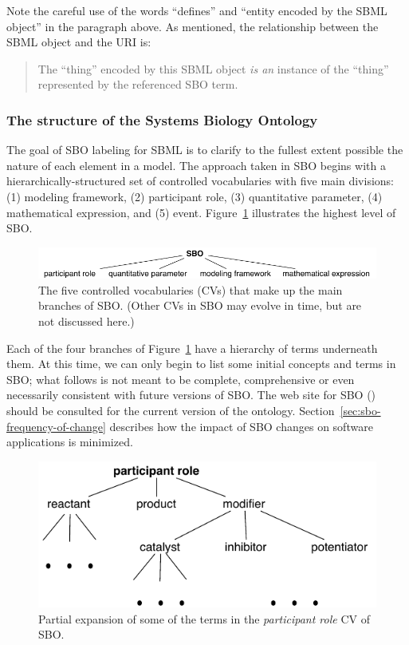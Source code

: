 Note the careful use of the words ``defines'' and ``entity encoded
by the SBML object'' in the paragraph above.  As mentioned, the
relationship between the SBML object and the URI is:
\begin{quote}
  The ``thing'' encoded by this SBML object \emph{is an} instance
  of the ``thing'' represented by the referenced SBO term.
\end{quote}


\subsubsection{The structure of the Systems Biology Ontology}

The goal of SBO labeling for SBML is to clarify to the fullest
extent possible the nature of each element in a
model.  The approach taken in SBO begins with a
hierarchically-structured set of controlled vocabularies with five
main divisions: (1) modeling framework, (2) participant role, (3)
quantitative parameter, (4) mathematical expression, and (5) event.
Figure~\ref{fig:sbo-top-level} illustrates the highest level of
SBO.

\begin{figure}[tbh]
  \vspace*{1ex}
  \centering
  \includegraphics[scale = 0.9]{figs/sbo-top-level}
  \caption{The five controlled vocabularies (CVs) that make up the
    main branches of SBO.  (Other CVs in SBO may evolve in time,
    but are not discussed here.)}
  \label{fig:sbo-top-level}
\end{figure}

Each of the four branches of Figure~\ref{fig:sbo-top-level} have a
hierarchy of terms underneath them.  At this time, we can only
begin to list some initial concepts and terms in SBO; what follows
is not meant to be complete, comprehensive or even necessarily
consistent with future versions of SBO.  The web site for SBO
(\sboref) should be consulted for the current version of the
ontology.  Section~\ref{sec:sbo-frequency-of-change} describes how
the impact of SBO changes on software applications is minimized.

\begin{figure}[htb]
  \vspace*{1ex}
  \centering
  \includegraphics[scale = 0.9]{figs/sbo-participant-role}
  \caption{Partial expansion of some of the terms in the
    \emph{participant role} CV of SBO.}
  \label{fig:expanded-species}
\end{figure}

